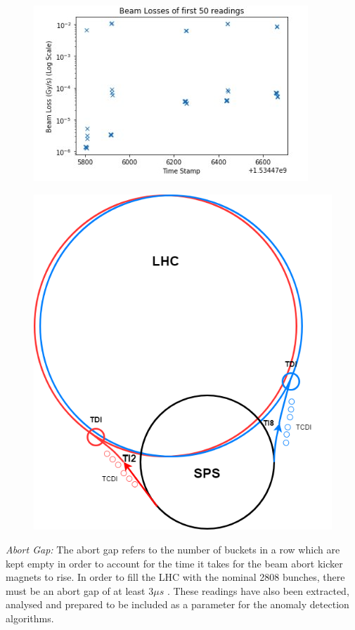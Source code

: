 \documentclass[12pt, twoside]{report}
\begin{document}
	\begin{figure}[t]
		\centering
		\begin{minipage}{.5\textwidth}
			\centering
			\includegraphics[width=\linewidth]{BLM1}
			\label{fig:BLMlosses}
		\end{minipage}%
		\begin{minipage}{.5\textwidth}
			\centering
			\includegraphics[width=.7\linewidth]{CERNComplex}
			\label{fig:CERNAccelerator}
		\end{minipage}
	\end{figure}
	
	\par \textit{Abort Gap:} The abort gap refers to the number of buckets in a row which are kept empty in order to account for the time it takes for the beam abort kicker magnets to rise. In order to fill the LHC with the nominal 2808 bunches, there must be an abort gap of at least 3$\mu s$ \cite{r:AbortGap}. These readings have also been extracted, analysed and prepared to be included as a parameter for the anomaly detection algorithms.
	
\end{document}
